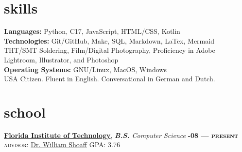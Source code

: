 \documentclass[margin,10pt]{res}
\begin{document}
\begin{resume}

    \section{\sc \lsstyle skills}
        \textbf{Languages:} Python, C17, JavaScript, \textsc{HTML/CSS}, Kotlin      \\
        \textbf{Technologies:} Git/GitHub, Make, SQL, Markdown, LaTex, Mermaid      \\
        \textsc{THT/SMT} Soldering, Film/Digital Photography, Proficiency in Adobe Lightroom, Illustrator, and Photoshop \\
        \textbf{Operating Systems:} \textsc{GNU}/Linux, MacOS, Windows              \\
        USA Citizen. Fluent in English. Conversational in German and Dutch.

    \section{\sc \lsstyle school}
        \href{https://www.fit.edu/}{\textbf{Florida Institute of Technology}}, \textit{\textbf{B.S.} Computer Science}
        \hfill
        \textsc{\bfseries{}-08 --- \textsc{present}}\\
        \textsc{advisor:} \href{https://www.linkedin.com/in/william-shoaff-883408/}{Dr. William Shoaff}
        \hfill
        GPA: 3.76


\end{resume}
\end{document}
